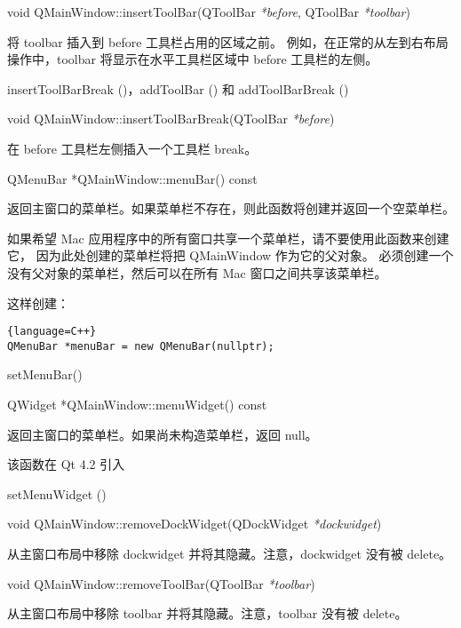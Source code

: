 void QMainWindow::insertToolBar(QToolBar \emph{*before}, QToolBar \emph{*toolbar})

将 toolbar 插入到 before 工具栏占用的区域之前。
例如，在正常的从左到右布局操作中，toolbar 将显示在水平工具栏区域中 before 工具栏的左侧。

\begin{notice}[另请参阅]
insertToolBarBreak ()，addToolBar () 和 addToolBarBreak ()
\end{notice}

\splitLine

void QMainWindow::insertToolBarBreak(QToolBar \emph{*before})

在 before 工具栏左侧插入一个工具栏 break。

\splitLine

QMenuBar *QMainWindow::menuBar() const

返回主窗口的菜单栏。如果菜单栏不存在，则此函数将创建并返回一个空菜单栏。

如果希望 Mac 应用程序中的所有窗口共享一个菜单栏，请不要使用此函数来创建它，
因为此处创建的菜单栏将把 QMainWindow 作为它的父对象。
必须创建一个没有父对象的菜单栏，然后可以在所有 Mac 窗口之间共享该菜单栏。

这样创建：

\begin{lstlisting}{language=C++}
QMenuBar *menuBar = new QMenuBar(nullptr);
\end{lstlisting}

\begin{notice}[另请参阅]
setMenuBar()
\end{notice}

\splitLine

QWidget *QMainWindow::menuWidget() const

返回主窗口的菜单栏。如果尚未构造菜单栏，返回 null。

该函数在 Qt 4.2 引入

\begin{notice}[另请参阅]
setMenuWidget ()
\end{notice}

\splitLine

void QMainWindow::removeDockWidget(QDockWidget \emph{*dockwidget})

从主窗口布局中移除 dockwidget 并将其隐藏。注意，dockwidget 没有被 delete。

\splitLine

void QMainWindow::removeToolBar(QToolBar \emph{*toolbar})

从主窗口布局中移除 toolbar 并将其隐藏。注意，toolbar 没有被 delete。

